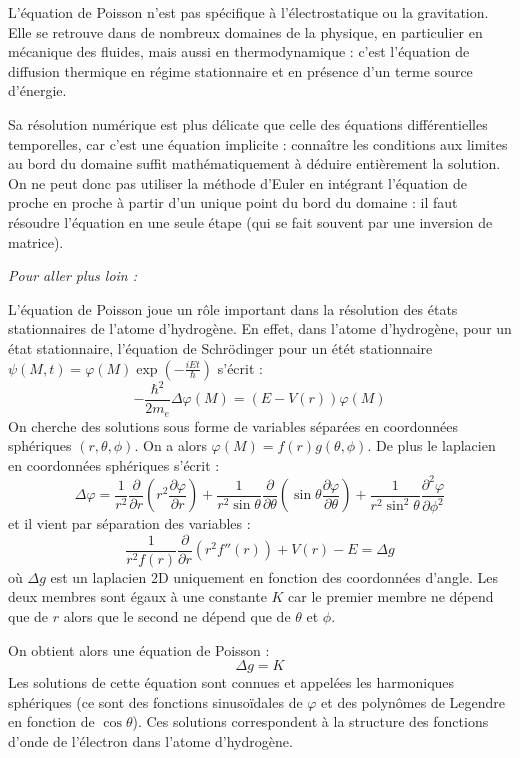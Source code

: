 \documentclass[11pt,fleqn]{book} %
\begin{document}
\begin{encart}
	L'équation de Poisson n'est pas spécifique à l'électrostatique ou la gravitation. Elle se retrouve dans de nombreux domaines de la physique, en particulier en mécanique des fluides, mais aussi en thermodynamique : c'est l'équation de diffusion thermique en régime stationnaire et en présence d'un terme source d'énergie.
	
	Sa résolution numérique est plus délicate que celle des équations différentielles temporelles, car c'est une équation implicite : connaître les conditions aux limites au bord du domaine suffit mathématiquement à déduire entièrement la solution. On ne peut donc pas utiliser la méthode d'Euler en intégrant l'équation de proche en proche à partir d'un unique point du bord du domaine : il faut résoudre l'équation en une seule étape (qui se fait souvent par une inversion de matrice).
	
	\textit{Pour aller plus loin :}
	
	L'équation de Poisson joue un rôle important dans la résolution des états stationnaires de l'atome d'hydrogène. En effet, dans l'atome d'hydrogène, pour un état stationnaire, l'équation de Schrödinger pour un étét stationnaire $\psi(M,t) = \varphi(M) \exp(-\frac{i E t}{\hbar})$ s'écrit :
	\begin{equation}
		- \frac{\hbar^2}{2 m_e} \Delta \varphi(M) = (E - V(r)) \varphi(M)
	\end{equation}
	On cherche des solutions sous forme de variables séparées en coordonnées sphériques $(r,\theta,\phi)$. On a alors $\varphi(M) = f(r)g(\theta,\phi)$. De plus le laplacien en coordonnées sphériques s'écrit :
	\begin{equation}
		\Delta \varphi = \frac{1}{r^2}\frac{\partial}{\partial r}
		\left(
		r^2 \frac{\partial \varphi}{\partial r}
		\right)
		+
		\frac{1}{r^2 \sin\theta}\frac{\partial}{\partial \theta}
		\left(
		\sin\theta \frac{\partial \varphi}{\partial \theta}
		\right)
		+
		\frac{1}{r^2 \sin^2\theta}
		\frac{\partial^2 \varphi}{\partial \phi^2}
	\end{equation}
	 et il vient par séparation des variables :
	\begin{equation}
			\frac{1}{r^2 f(r)} \frac{\partial}{\partial r} \left( r^2 f''(r) \right) + V(r) - E = \Delta g
	\end{equation}
		où $\Delta g$ est un laplacien 2D uniquement en fonction des coordonnées d'angle. Les deux membres sont égaux à une constante  $K$ car le premier membre ne dépend que de $r$ alors que le second ne dépend que de $\theta$ et $\phi$.
		
		On obtient alors une équation de Poisson :
		\begin{equation}
			\Delta g = K
		\end{equation}
		Les solutions de cette équation sont connues et appelées les harmoniques sphériques (ce sont des fonctions sinusoïdales de $\varphi$ et des polynômes de Legendre en fonction de $\cos \theta$). Ces solutions correspondent à la structure des fonctions d'onde de l'électron dans l'atome d'hydrogène. 
\end{encart}
\end{document}
